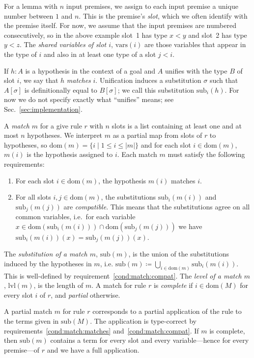 \documentclass[runningheads,leqno]{llncs}
\newcommand{\vars}{\ensuremath{\mathrm{vars}}}
\newcommand{\dom}{\ensuremath{\mathrm{dom}}}
\newcommand{\sub}{\ensuremath{\mathrm{sub}}}
\newcommand{\lvl}{\ensuremath{\mathrm{lvl}}}
\begin{document}
For a lemma with $n$ input premises, we assign to each input premise a unique number between $1$ and $n$.
This is the premise's \emph{slot}, which we often identify with the premise itself.
For now, we assume that the input premises are numbered consecutively, so in the above example slot~1 has type $x < y$ and slot~2 has type $y < z$.
The \emph{shared variables of slot $i$}, $\vars(i)$ are those variables that appear in the type of $i$ and also in at least one type of a slot $j < i$.

If $h : A$ is a hypothesis in the context of a goal and $A$ unifies with the type $B$ of slot $i$, we say that $h$ \emph{matches} $i$.
Unification induces a substitution $σ$ such that $A[σ]$ is definitionally equal to $B[σ]$; we call this substitution $\sub_{i}(h)$.
For now we do not specify exactly what \enquote{unifies} means; see Sec.~\ref{sec:implementation}.

A \textit{match} $m$ for a give rule $r$ with $n$ slots is a list containing at least one and at most $n$ hypotheses.
We interpret $m$ as a partial map from slots of $r$ to hypotheses, so $\dom(m) = \{i \mid 1 ≤ i ≤ |m| \}$ and for each slot $i ∈ \dom(m)$, $m(i)$ is the hypothesis assigned to $i$.
Each match $m$ must satisfy the following requirements:
\begin{enumerate}
  \item\label{cond:match:matches} For each slot $i ∈ \dom(m)$, the hypothesis $m(i)$ matches $i$.
  \item\label{cond:match:compat} For all slots $i,j ∈ \dom(m)$, the substitutions $\sub_{i}(m(i))$ and $\sub_{j}(m(j))$ are \emph{compatible}.
        This means that the substitutions agree on all common variables, i.e.\ for each variable $x ∈ \dom(\sub_{i}(m(i))) ∩ \dom(\sub_{j}(m(j)))$ we have $\sub_{i}(m(i))(x) = \sub_{j}(m(j))(x)$.
\end{enumerate}
The \emph{substitution of a match $m$}, $\sub(m)$, is the union of the substitutions induced by the hypotheses in $m$, i.e. $\sub(m) ≔ ⋃_{i ∈ \dom(m)}\sub_{i}(m(i))$.
This is well-defined by requirement~\ref{cond:match:compat}.
The \textit{level of a match $m$}, $\lvl(m)$, is the length of $m$.
A match for rule $r$ is \textit{complete} if $i ∈ \dom(M)$ for every slot $i$ of $r$, and \emph{partial} otherwise.

A partial match $m$ for rule $r$ corresponds to a partial application of the rule to the terms given in $\sub(M)$.
The application is type-correct by requirements~\ref{cond:match:matches} and~\ref{cond:match:compat}.
If $m$ is complete, then $\sub(m)$ contains a term for every slot and every variable---hence for every premise---of $r$ and we have a full application.
\end{document}
